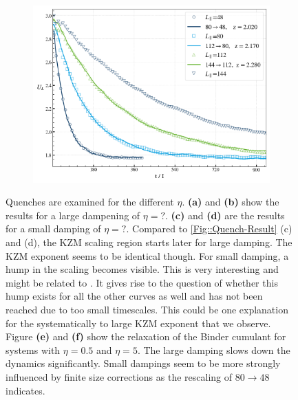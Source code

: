 \begin{figure}
\begin{subfigure}{0.475\textwidth}
			\includegraphics[width=0.97\linewidth]{graphics/z-eta-5-2.png}
		\end{subfigure}
		\caption{Quenches are examined for the different $\eta$. \textbf{(a)} and \textbf{(b)} show the results for a large dampening of $\eta =	?$. 	\textbf{(c)} and \textbf{(d)} are the results for a small damping of $\eta =	?$. Compared to \autoref{Fig::Quench-Result} (c) and (d), the KZM	scaling region starts later for large damping. The KZM exponent seems to be identical though. For small damping, a hump in the scaling becomes visible. This is very interesting and might be related to \cite{ladewig2020kibble}. It gives rise to the question of whether this hump exists for all the other curves as well and has not been reached due to too small timescales. This could be one explanation for the systematically to large KZM exponent that we observe. Figure \textbf{(e)} and \textbf{(f)} show the relaxation of the Binder cumulant for systems with $\eta = 0.5$ and $\eta = 5$. The large damping slows down the dynamics significantly. Small dampings seem to be more strongly influenced by finite size corrections as the rescaling of $80 \rightarrow 48$ indicates.}
		\label{Fig::Quench-Result-eta}
	\end{figure}		
